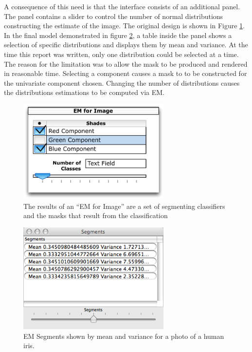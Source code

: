 \documentclass[11pt]{article}
\begin{document}
A consequence of this need is that the interface consists of an additional panel.  %
The panel contains a slider to control the number of normal distributions constructing the estimate of the image.  The original design is shown in Figure \ref{emComponentSelection}. In the final model demonstrated in figure \ref{segmentsPanel}, a table inside the panel shows a selection of specific distributions and displays them by mean and variance.  At the time this report was written, only one distribution could be selected at a time.  The reason for the limitation was to allow the mask to be produced and rendered in reasonable time.   Selecting a component causes a mask to to be constructed for the univariate component %
chosen.  Changing the number of distributions causes the distributions estimations to be computed via EM.


\begin{figure}[htbp] %
   \centering
   \includegraphics[width=3in]{emComponentSelection.pdf} 
   \caption{The results of an ``EM for Image'' are
a set of segmenting classifiers and the 
masks that result from the classification}
   \label{emComponentSelection}
\end{figure}


\begin{figure}[htbp] %
   \centering
   \includegraphics[width=3in]{segmentsPanel.png} 
   \caption{EM Segments shown by mean and variance for a photo of a human iris.}
   \label{segmentsPanel}
\end{figure}
\end{document}
